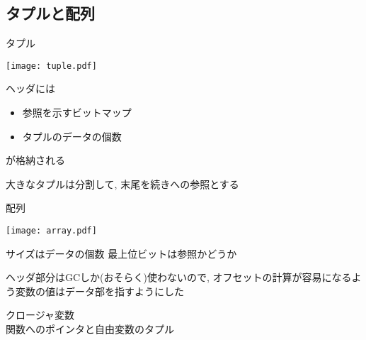 \documentclass[papersize,30pt,slide]{jsarticle}
\begin{document}
\newpage
\subsection{タプルと配列}
タプル

\texttt{[image: tuple.pdf]}

ヘッダには
\begin{itemize}
\item 参照を示すビットマップ
\item タプルのデータの個数
\end{itemize}
が格納される

大きなタプルは分割して, 末尾を続きへの参照とする

\newpage

配列

\texttt{[image: array.pdf]}

サイズはデータの個数 最上位ビットは参照かどうか

\vspace{1em}

ヘッダ部分はGCしか(おそらく)使わないので, オフセットの計算が容易になるよう変数の値はデータ部を指すようにした

\vspace{1em}

クロージャ変数 \\
関数へのポインタと自由変数のタプル
\end{document}
